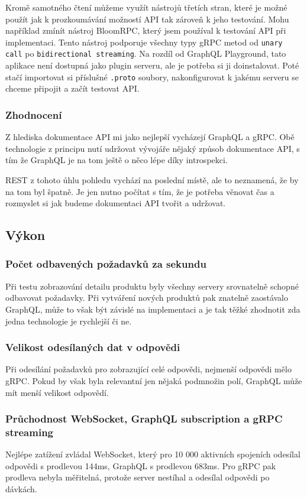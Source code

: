 \documentclass[thesis=M,czech]{FITthesis}[2019/12/23]
\begin{document}
Kromě samotného čtení můžeme využít nástrojů třetích stran, které je možné použít jak k prozkoumávání možností API tak zároveň k jeho testování. Mohu například zmínít nástroj BloomRPC, %
který jsem používal k testování API při implementaci. Tento nástroj podporuje všechny typy gRPC metod od \texttt{unary call} po \texttt{bidirectional streaming}. Na rozdíl od GraphQL Playground, tato aplikace není dostupná jako plugin serveru, ale je potřeba si ji doinstalovat. Poté stačí importovat si příslušné \texttt{.proto} soubory, nakonfigurovat k jakému serveru se chceme připojit a začít testovat API.

\subsubsection*{Zhodnocení}
Z hlediska dokumentace API mi jako nejlepší vycházejí GraphQL a gRPC. Obě technologie z principu nutí udržovat vývojáře nějaký způsob dokumentace API, s tím že GraphQL je na tom ještě o něco lépe díky introspekci.

REST z tohoto úhlu pohledu vychází na poslední místě, ale to neznamená, že by na tom byl špatně. Je jen nutno počítat s tím, že je potřeba věnovat čas a rozmyslet si jak budeme dokumentaci API tvořit a udržovat.

\subsection{Výkon}

\subsubsection*{Počet odbavených požadavků za sekundu}
Při testu zobrazování detailu produktu byly všechny servery srovnatelně schopné odbavovat požadavky. Při vytváření nových produktů pak znatelně zaostávalo GraphQL, může to však být závislé na implementaci a je tak těžké zhodnotit zda jedna technologie je rychlejší či ne.
\subsubsection*{Velikost odesílaných dat v odpovědi}
Při odesílání požadavků pro zobrazující celé odpovědi, nejmenší odpovědi mělo gRPC. Pokud by však byla relevantní jen nějaká podmnožin polí, GraphQL může mít menší velikost odpovědí.
\subsubsection*{Průchodnost WebSocket, GraphQL subscription a gRPC streaming}
Nejlépe zatížení zvládal WebSocket, který pro 10 000 aktivních spojeních odesílal odpovědi s prodlevou 144ms, GraphQL s prodlevou 683ms. Pro gRPC pak prodleva nebyla měřitelná, protože server nestíhal a odesílal odpovědi po dávkách.
\end{document}

